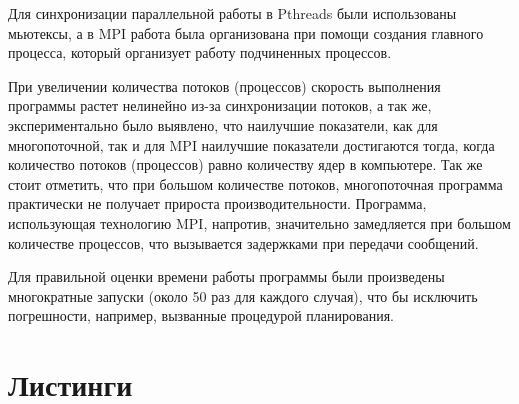 \documentclass[12pt,a4paper]{report}
\begin{document}
				Для синхронизации параллельной работы в Pthreads были использованы 
				мьютексы, а в MPI работа была организована при помощи создания главного 
				процесса,	который организует работу подчиненных процессов.
				
				При увеличении количества потоков (процессов) скорость выполнения 
				программы растет нелинейно из-за синхронизации потоков, а так же, 
				экспериментально было выявлено, что наилучшие показатели, как для 
				многопоточной, так и для MPI наилучшие показатели достигаются тогда, 
				когда количество потоков (процессов) равно количеству ядер в 
				компьютере. Так же стоит отметить, что при большом количестве потоков, 
				многопоточная программа практически не получает прироста 
				производительности. Программа, использующая технологию MPI, напротив, 
				значительно замедляется при большом количестве процессов, что 
				вызывается задержками при передачи сообщений.
				
				Для правильной оценки времени работы программы были произведены 
				многократные запуски (около 50 раз для каждого случая), что бы 
				исключить погрешности, например, вызванные процедурой планирования.
				
			\section{Листинги}

				
			
				
			
				
			
				
			
\end{document}
